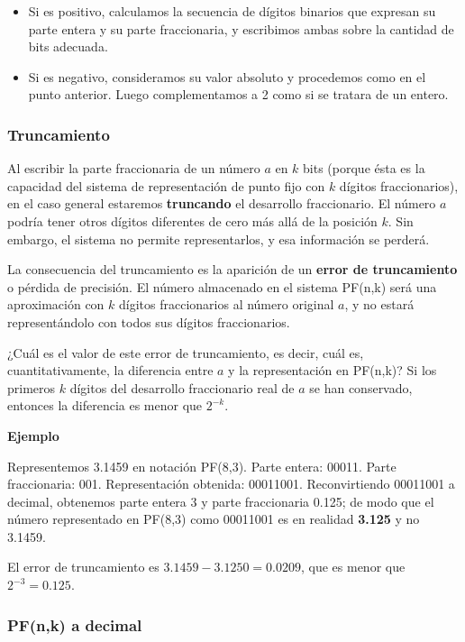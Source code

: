 \documentclass[spanish,A4,]{article}
\begin{document}
\begin{itemize}
\itemsep1pt\parskip0pt
\item
  Si es positivo, calculamos la secuencia de dígitos binarios que
  expresan su parte entera y su parte fraccionaria, y escribimos ambas
  sobre la cantidad de bits adecuada.
\item
  Si es negativo, consideramos su valor absoluto y procedemos como en el
  punto anterior. Luego complementamos a 2 como si se tratara de un
  entero.
\end{itemize}

\subsubsection{Truncamiento}\label{truncamiento}

Al escribir la parte fraccionaria de un número $a$ en $k$ bits (porque
ésta es la capacidad del sistema de representación de punto fijo con $k$
dígitos fraccionarios), en el caso general estaremos \textbf{truncando}
el desarrollo fraccionario. El número $a$ podría tener otros dígitos
diferentes de cero más allá de la posición $k$. Sin embargo, el sistema
no permite representarlos, y esa información se perderá.

La consecuencia del truncamiento es la aparición de un \textbf{error de
truncamiento} o pérdida de precisión. El número almacenado en el sistema
PF(n,k) será una aproximación con $k$ dígitos fraccionarios al número
original $a$, y no estará representándolo con todos sus dígitos
fraccionarios.

¿Cuál es el valor de este error de truncamiento, es decir, cuál es,
cuantitativamente, la diferencia entre $a$ y la representación en
PF(n,k)? Si los primeros $k$ dígitos del desarrollo fraccionario real de
$a$ se han conservado, entonces la diferencia es menor que $2^{-k}$.

\textbf{Ejemplo}

Representemos 3.1459 en notación PF(8,3). Parte entera: 00011. Parte
fraccionaria: 001. Representación obtenida: 00011001. Reconvirtiendo
00011001 a decimal, obtenemos parte entera 3 y parte fraccionaria 0.125;
de modo que el número representado en PF(8,3) como 00011001 es en
realidad \textbf{3.125} y no 3.1459.

El error de truncamiento es $3.1459 - 3.1250 = 0.0209$, que es menor que
$2^{-3} = 0.125$.

\subsubsection{PF(n,k) a decimal}\label{pfnk-a-decimal}
\end{document}
